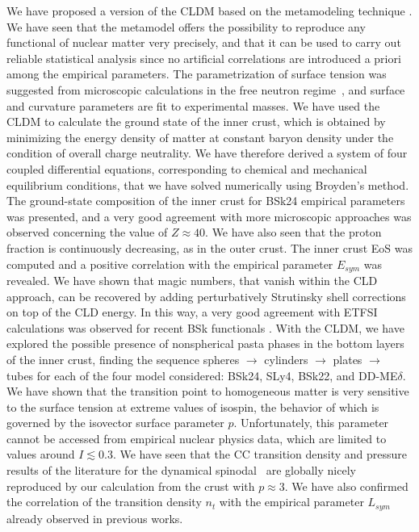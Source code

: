 We have proposed a version of the CLDM based on the metamodeling
technique \cite{Margueron2018a,Margueron2018b}. We have seen that the
metamodel offers the possibility to reproduce any functional of nuclear matter 
very precisely, and that it can be used to carry out reliable statistical 
analysis since no artificial correlations are introduced a priori among the 
empirical parameters. The parametrization of surface tension was suggested from
microscopic calculations in the free neutron regime~\cite{Ravenhall1983}, and
surface and curvature parameters are fit to experimental masses. We have used 
the CLDM to calculate the ground state of the inner crust, which is obtained by
minimizing the energy density of matter at constant baryon density under the
condition of overall charge neutrality. We have therefore derived a system of
four coupled differential equations, corresponding to chemical and mechanical
equilibrium conditions, that we have solved numerically using Broyden's method.
The ground-state composition of the inner crust for BSk24 empirical parameters 
was presented, and a very good agreement with more microscopic approaches was 
observed concerning the value of $Z \approx 40$. We have also seen that the 
proton fraction is continuously decreasing, as in the outer crust. The inner
crust EoS was computed and a positive correlation with the empirical 
parameter $E_{sym}$ was revealed. We have shown that magic numbers, that vanish
within the CLD approach, can be recovered by adding perturbatively Strutinsky
shell corrections on top of the CLD energy. In this way, a very good agreement 
with ETFSI calculations was observed for recent BSk 
functionals \cite{Pearson2018}. With the CLDM, we have explored the possible 
presence of nonspherical pasta phases in the bottom layers of the inner crust,
finding the sequence spheres $\rightarrow$ cylinders $\rightarrow$ plates
$\rightarrow$ tubes for each of the four model considered: BSk24, SLy4, BSk22,
and DD-ME$\delta$. We have shown that the transition point to homogeneous
matter is very sensitive to the surface tension at extreme values of isospin, 
the behavior of which is governed by the isovector surface parameter $p$.
Unfortunately, this parameter cannot be accessed from empirical nuclear physics 
data, which are limited to values around $I \lesssim 0.3$. We have seen that 
the CC transition density and pressure results of the literature for the 
dynamical spinodal~\cite{Ducoin2011} are globally nicely reproduced by our 
calculation from the crust with $p \approx 3$. We have also confirmed
the correlation of the transition density $n_t$ with the empirical parameter
$L_{sym}$ already observed in previous works.

